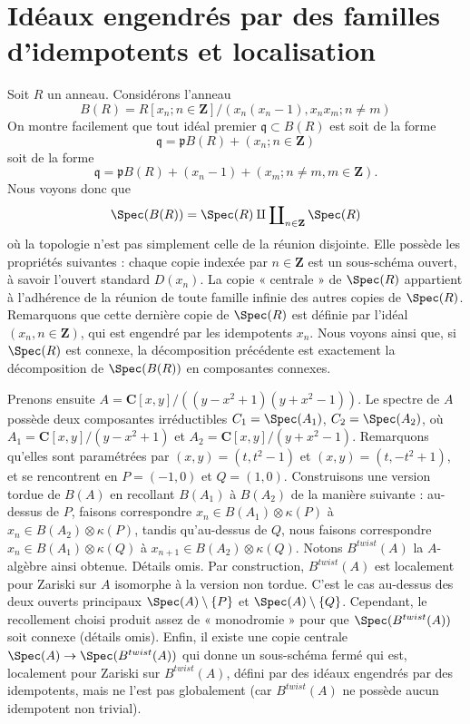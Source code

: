 \section[Idéaux d'idempotents et localisation]{Idéaux engendrés par des familles d'idempotents et localisation}
\label{section-ideal-locally-idempotents}

\noindent
Soit $R$ un anneau. Considérons l'anneau
$$
B(R) = R[x_n; n \in \mathbf{Z}]/(x_n(x_n - 1), x_nx_m; n \not = m)
$$
On montre facilement que tout idéal premier $\mathfrak q \subset B(R)$
est soit de la forme
$$
\mathfrak q = \mathfrak pB(R) + (x_n; n \in \mathbf{Z})
$$
soit de la forme
$$
\mathfrak q =
\mathfrak pB(R) + (x_n - 1) + (x_m; n \not = m, m \in \mathbf{Z}).
$$
Nous voyons donc que
$$
\Spec(B(R)) =
\Spec(R) \amalg \coprod\nolimits_{n \in \mathbf{Z}} \Spec(R)
$$
où la topologie n'est pas simplement celle de la réunion disjointe. Elle possède les
propriétés suivantes : chaque copie indexée par $n \in \mathbf{Z}$
est un sous-schéma ouvert, à savoir l'ouvert standard $D(x_n)$.
La copie « centrale » de $\Spec(R)$ appartient à l'adhérence de la réunion
de toute famille infinie des autres copies de $\Spec(R)$.
Remarquons que cette dernière copie de $\Spec(R)$ est définie par l'idéal
$(x_n, n \in \mathbf{Z})$, qui est engendré par les idempotents $x_n$.
Nous voyons ainsi que, si $\Spec(R)$ est connexe,
la décomposition précédente est exactement la décomposition de
$\Spec(B(R))$ en composantes connexes.

\medskip\noindent
Prenons ensuite $A = \mathbf{C}[x, y]/((y - x^2 + 1)(y + x^2 - 1))$.
Le spectre de $A$ possède deux composantes irréductibles
$C_1 = \Spec(A_1)$, $C_2 = \Spec(A_2)$,
où $A_1 = \mathbf{C}[x, y]/(y - x^2 + 1)$ et
$A_2 = \mathbf{C}[x, y]/(y + x^2 - 1)$. Remarquons qu'elles sont
paramétrées par $(x, y) = (t, t^2 - 1)$ et $(x, y) = (t, -t^2 + 1)$,
et se rencontrent en $P = (-1, 0)$ et $Q = (1, 0)$. Construisons une version
tordue de $B(A)$ en recollant $B(A_1)$ à $B(A_2)$ de la manière suivante :
au-dessus de $P$, faisons correspondre $x_n \in B(A_1) \otimes \kappa(P)$
à $x_n \in B(A_2) \otimes \kappa(P)$, tandis qu'au-dessus de $Q$,
nous faisons correspondre $x_n \in B(A_1) \otimes \kappa(Q)$
à $x_{n + 1} \in B(A_2) \otimes \kappa(Q)$.
Notons $B^{twist}(A)$ la $A$-algèbre ainsi obtenue.
Détails omis. Par construction,
$B^{twist}(A)$ est localement pour Zariski sur $A$ isomorphe à la version
non tordue. C'est le cas au-dessus des deux ouverts principaux
$\Spec(A) \setminus \{P\}$
et $\Spec(A) \setminus \{Q\}$.
Cependant, le recollement choisi produit assez de « monodromie » pour que
$\Spec(B^{twist}(A))$ soit connexe (détails omis).
Enfin, il existe une copie centrale
$\Spec(A) \to \Spec(B^{twist}(A))$
qui donne un sous-schéma fermé qui est, localement pour Zariski
sur $B^{twist}(A)$, défini par des idéaux engendrés par des idempotents, mais
ne l'est pas globalement (car $B^{twist}(A)$ ne possède aucun idempotent non trivial).


